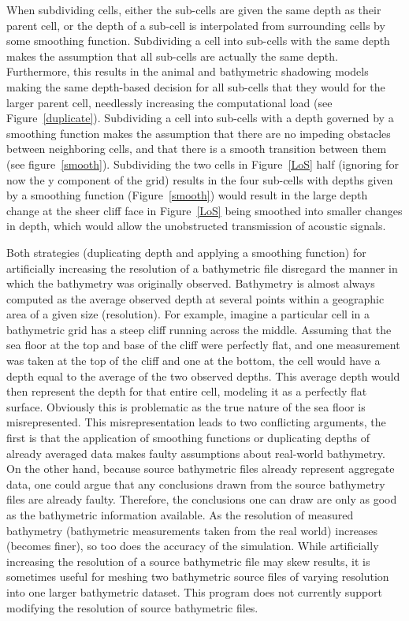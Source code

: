  
When subdividing cells, either the sub-cells are given the same depth as their parent cell, or the depth of a sub-cell is interpolated from surrounding cells by some smoothing function.  Subdividing a cell into sub-cells with the same depth makes the assumption that all sub-cells are actually the same depth.  Furthermore, this results in the animal and bathymetric shadowing models making the same depth-based decision for all sub-cells that they would for the larger parent cell, needlessly increasing the computational load (see Figure~\ref{duplicate}).  Subdividing a cell into sub-cells with a depth governed by a smoothing function makes the assumption that there are no impeding obstacles between neighboring cells, and that there is a smooth transition between them (see figure~\ref{smooth}).  Subdividing the two cells in Figure~\ref{LoS} half (ignoring for now the y component of the grid) results in the four sub-cells with depths given by a smoothing function (Figure~\ref{smooth}) would result in the large depth change at the sheer cliff face in Figure~\ref{LoS} being smoothed into smaller changes in depth, which would allow the unobstructed transmission of acoustic signals.


Both strategies (duplicating depth and applying a smoothing function) for artificially increasing the resolution of a bathymetric file disregard the manner in which the bathymetry was originally observed.  Bathymetry is almost always computed as the average observed depth at several points within a geographic area of a given size (resolution).  For example, imagine a particular cell in a bathymetric grid has a steep cliff running across the middle.  Assuming that the sea floor at the top and base of the cliff were perfectly flat, and one measurement was taken at the top of the cliff and one at the bottom, the cell would have a depth equal to the average of the two observed depths.  This average depth would then represent the depth for that entire cell, modeling it as a perfectly flat surface.  Obviously this is problematic as the true nature of the sea floor is misrepresented.  This misrepresentation leads to two conflicting arguments, the first is that the application of smoothing functions or duplicating depths of already averaged data makes faulty assumptions about real-world bathymetry.  On the other hand, because source bathymetric files already represent aggregate data, one could argue that any conclusions drawn from the source bathymetry files are already faulty.  Therefore, the conclusions one can draw are only as good as the bathymetric information available.  As the resolution of measured bathymetry (bathymetric measurements taken from the real world) increases (becomes finer), so too does the accuracy of the simulation.  While artificially increasing the resolution of a source bathymetric file may skew results, it is sometimes useful for meshing two bathymetric source files of varying resolution into one larger bathymetric dataset.  This program does not currently support modifying the resolution of source bathymetric files.

